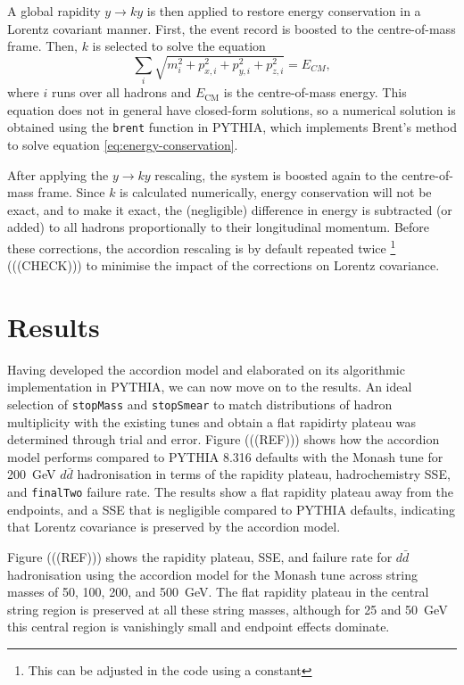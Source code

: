 \documentclass[12pt,a4paper]{report}
\begin{document}
A global rapidity $y \rightarrow ky$ is then applied to restore energy conservation in a Lorentz covariant manner. First, the event record is boosted to the centre-of-mass frame. Then, $k$ is selected to solve the equation
\begin{equation} \label{eq:energy-conservation}
  \sum_i \sqrt{m_i^2 + p_{x,i}^2 + p_{y,i}^2 + p_{z,i}^2} = E_{CM},
\end{equation}
where $i$ runs over all hadrons and $E_\text{CM}$ is the centre-of-mass energy. This equation does not in general have closed-form solutions, so a numerical solution is obtained using the \texttt{brent} function in PYTHIA, which implements Brent's method \cite{Brent1973} to solve equation \eqref{eq:energy-conservation}.

After applying the $y \rightarrow ky$ rescaling, the system is boosted again to the centre-of-mass frame. Since $k$ is calculated numerically, energy conservation will not be exact, and to make it exact, the (negligible) difference in energy is subtracted (or added) to all hadrons proportionally to their longitudinal momentum. Before these corrections, the accordion rescaling is by default repeated twice \footnote{This can be adjusted in the code using a constant} (((CHECK))) to minimise the impact of the corrections on Lorentz covariance.

\section{Results}
Having developed the accordion model and elaborated on its algorithmic implementation in PYTHIA, we can now move on to the results. An ideal selection of \texttt{stopMass} and \texttt{stopSmear} to match distributions of hadron multiplicity with the existing tunes and obtain a flat rapidirty plateau was determined through trial and error. Figure (((REF))) shows how the accordion model performs compared to PYTHIA 8.316 defaults with the Monash tune for \qty{200}{\giga\electronvolt} $d\bar{d}$ hadronisation in terms of the rapidity plateau, hadrochemistry SSE, and \texttt{finalTwo} failure rate. The results show a flat rapidity plateau away from the endpoints, and a SSE that is negligible compared to PYTHIA defaults, indicating that Lorentz covariance is preserved by the accordion model.

Figure (((REF))) shows the rapidity plateau, SSE, and failure rate for $d\bar{d}$ hadronisation using the accordion model for the Monash tune across string masses of 50, 100, 200, and \qty{500}{\giga\electronvolt}. The flat rapidity plateau in the central string region is preserved at all these string masses, although for 25 and \qty{50}{\giga\electronvolt} this central region is vanishingly small and endpoint effects dominate.
\end{document}
